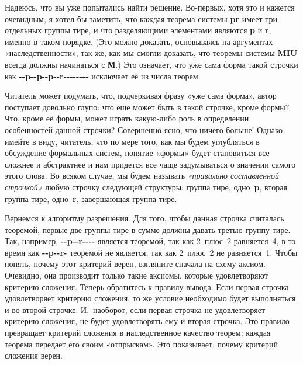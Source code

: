 \documentclass[../main.tex]{subfiles}
\begin{document}
Надеюсь, что вы уже попытались найти решение.
Во-первых, хотя это и кажется очевидным, я хотел бы заметить, что каждая теорема системы \textbf{pr} имеет три отдельных группы тире, и что разделяющими элементами являются \textbf{p} и \textbf{r}, именно в таком порядке.
(Это можно доказать, основываясь на аргументах «наследственности», так же, как мы смогли доказать, что теоремы системы \textbf{MIU} всегда должны начинаться с \textbf{М}.)
Это означает, что уже сама форма такой строчки как \textbf{-{}-p-{}-p-{}-p-{}-r-{}-{}-{}-{}-{}-{}-{}-} исключает её из числа теорем.

Читатель может подумать, что, подчеркивая фразу «уже сама форма», автор поступает довольно глупо: что ещё может быть в такой строчке, кроме формы?
Что, кроме её формы, может играть какую-либо роль в определении особенностей данной строчки?
Совершенно ясно, что ничего больше!
Однако имейте в виду, читатель, что по мере того, как мы будем углубляться в обсуждение формальных систем, понятие «формы» будет становиться все сложнее и абстрактнее и нам придется все чаще задумываться о значении самого этого слова.
Во всяком случае, мы будем называть \emph{«правильно составленной строчкой»} любую строчку следующей структуры: группа тире, одно~\textbf{p}, вторая группа тире, одно~\textbf{r}, завершающая группа тире.

Вернемся к алгоритму разрешения. Для того, чтобы данная строчка считалась теоремой, первые две группы тире в сумме должны давать третью группу тире.
Так, например, \textbf{-{}-p-{}-r-{}-{}-{}-} является теоремой, так как 2~плюс~2 равняется~4, в то время как \textbf{-{}-p-{}-r-} теоремой не является, так как 2~плюс~2 не равняется~1.
Чтобы понять, почему этот критерий верен, взгляните сначала на схему аксиом.
Очевидно, она производит только такие аксиомы, которые удовлетворяют критерию сложения.
Теперь обратитесь к правилу вывода.
Если первая строчка удовлетворяет критерию сложения, то же условие необходимо будет выполняться и во второй строчке.
И,~наоборот, если первая строчка не удовлетворяет критерию сложения, не будет удовлетворять ему и вторая строчка.
Это правило превращает критерий сложения в наследственное качество теорем; каждая теорема передает его своим «отпрыскам».
Это показывает, почему критерий сложения верен.
\end{document}

